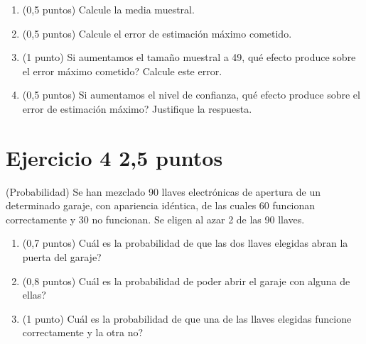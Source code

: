 \documentclass[11pt]{article}
\begin{document}
\begin{enumerate}[label=(\alph*)]

  \item (0,5 puntos)  Calcule la media muestral.

  

  \item (0,5 puntos)  Calcule el error de estimación máximo cometido.

  

  \item (1 punto)  Si aumentamos el tamaño muestral a 49, \textquestiondown{}qué efecto produce sobre el error máximo cometido? Calcule este error.

  

  \item (0,5 puntos)  Si aumentamos el nivel de confianza, \textquestiondown{}qué efecto produce sobre el error de estimación máximo? Justifique la respuesta.

  

\end{enumerate}


\section*{Ejercicio 4 \hfill 2,5 puntos} (Probabilidad) Se han mezclado 90 llaves electrónicas de apertura de un determinado garaje, con apariencia idéntica, de las cuales 60 funcionan correctamente y 30 no funcionan. Se eligen al azar 2 de las 90 llaves.

\begin{enumerate}[label=(\alph*)]

  \item (0,7 puntos)  \textquestiondown{}Cuál es la probabilidad de que las dos llaves elegidas abran la puerta del garaje?

  

  \item (0,8 puntos)  \textquestiondown{}Cuál es la probabilidad de poder abrir el garaje con alguna de ellas?

  

  \item (1 punto)  \textquestiondown{}Cuál es la probabilidad de que una de las llaves elegidas funcione correctamente y la otra no?

  

\end{enumerate}



\clearpage
\end{document}
